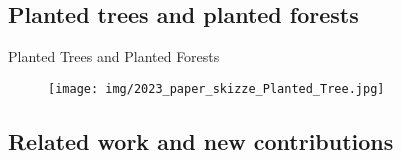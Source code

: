 \documentclass{beamer}
\begin{document}
\subsection{Planted trees and planted forests}

\begin{frame}{Planted Trees and Planted Forests}


    \begin{figure}[h]
        \centering
        \vspace{-10pt} %
        \texttt{[image: img/2023\_paper\_skizze\_Planted\_Tree.jpg]}
        \vspace{-10pt}
        \label{fig:Figure_Ewald-MP_Algo_Structure}
    \end{figure}
    
\end{frame}



\subsection{Related work and new contributions}
\end{document}
